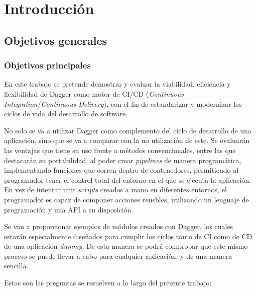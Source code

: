 \chapter{Introducción}


\section{Objetivos generales}


\subsection*{Objetivos principales}

En este trabajo se pretende demostrar y evaluar la viabilidad, eficiencia y flexibilidad de Dagger\cite{dagger} como motor de CI/CD (\textit{Continuous Integration}/\textit{Continuous Delivery})\cite{ci,cd}, con el fin de estandarizar y modernizar los ciclos de vida del desarrollo de software.

No solo se va a utilizar Dagger como complemento del ciclo de desarrollo de una aplicación, sino que se va a comparar con la no utilización de este. Se evaluarán las ventajas que tiene su uso frente a métodos convencionales, entre las que destacarán su portabilidad, al poder crear \textit{pipelines} de manera programática, implementando funciones que corren dentro de contenedores, permitiendo al programador tener el control total del entorno en el que se ejecuta la aplicación. En vez de intentar unir \textit{scripts} creados a mano en diferentes entornos, el programador es capaz de componer acciones reusbles, utilizando un lenguaje de programación y una API a su disposición.

Se van a proporcionar ejemplos de módulos creados con Dagger, los cuales estarán especialmente diseñados para cumplir los ciclos tanto de CI como de CD de una aplicación \textit{dummy}. De esta manera se podrá comprobar que este mismo proceso se puede llevar a cabo para cualquier aplicación, y de una manera sencilla.

Estas son las preguntas se resuelven a lo largo del presente trabajo:

